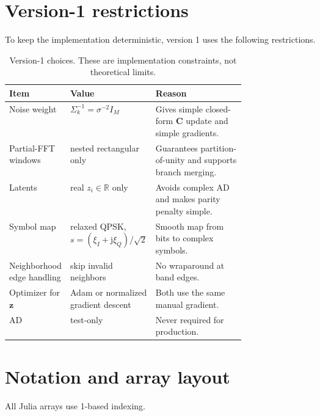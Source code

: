 \documentclass[11pt]{article}
\newcommand{\R}{\mathbb{R}}
\newcommand{\jj}{\mathrm{j}}
\begin{document}
\section{Version-1 restrictions}

To keep the implementation deterministic, version 1 uses the following restrictions.

\begin{table}[h]
\centering
\caption{Version-1 choices.  These are implementation constraints, not theoretical limits.}
\begin{tabular}{@{}llp{0.45\linewidth}@{}}
\toprule
Item & Value & Reason \\
\midrule
Noise weight & $\Sigma_k^{-1}=\sigma^{-2}I_M$ & Gives simple closed-form $\mathbf C$ update and simple gradients. \\
Partial-FFT windows & nested rectangular only & Guarantees partition-of-unity and supports branch merging. \\
Latents & real $z_i\in\R$ only & Avoids complex AD and makes parity penalty simple. \\
Symbol map & relaxed QPSK, $s=(\xi_I+\jj\xi_Q)/\sqrt2$ & Smooth map from bits to complex symbols. \\
Neighborhood edge handling & skip invalid neighbors & No wraparound at band edges. \\
Optimizer for $\bm z$ & Adam or normalized gradient descent & Both use the same manual gradient. \\
AD & test-only & Never required for production. \\
\bottomrule
\end{tabular}
\end{table}

\section{Notation and array layout}

All Julia arrays use 1-based indexing.
\end{document}
